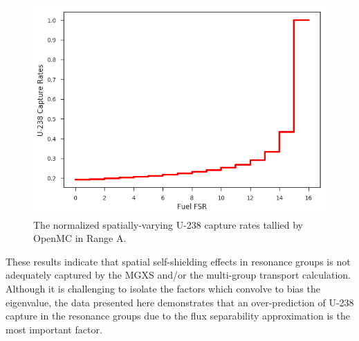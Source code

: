 \begin{figure}[h!]
\centering
\includegraphics[width=\linewidth]{figures/u238-capt-rates-fuel-fsrs}
\caption{The normalized spatially-varying U-238 capture rates tallied by OpenMC in Range A.}
\label{fig:u238-capture-space}
\end{figure}

These results indicate that spatial self-shielding effects in resonance groups is not adequately captured by the MGXS and/or the multi-group transport calculation. Although it is challenging to isolate the factors which convolve to bias the eigenvalue, the data presented here demonstrates that an over-prediction of U-238 capture in the resonance groups due to the flux separability approximation is the most important factor.
